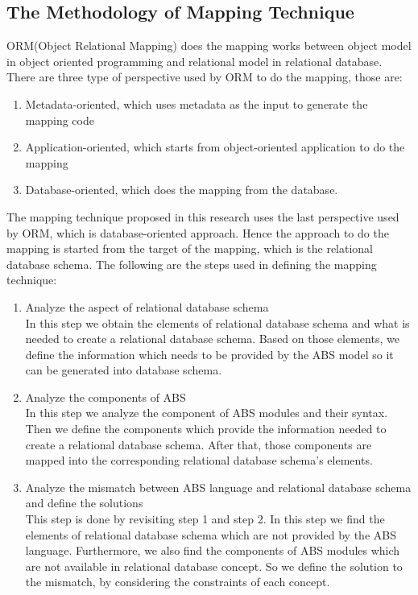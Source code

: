 \documentclass[conference]{IEEEtran}
\begin{document}
\subsection{The Methodology of Mapping Technique}
ORM(Object Relational Mapping) does the mapping works between object model in object oriented programming and relational model in relational database. There are three type of perspective used by ORM to do the mapping, those are:
\begin{enumerate}
	\item Metadata-oriented, which uses metadata as the input to generate the mapping code
	\item Application-oriented, which starts from object-oriented application to do the mapping
	\item Database-oriented, which does the mapping from the database.
\end{enumerate}

The mapping technique proposed in this research uses the last perspective used by ORM, which is database-oriented approach. Hence the approach to do the mapping is started from the target of the mapping, which is the relational database schema. The following are the steps used in defining the mapping technique:

\begin{enumerate}
	\item Analyze the aspect of relational database schema\\
	In this step we obtain the elements of relational database schema and what is needed to create a relational database schema. Based on those elements, we define the information which needs to be provided by the ABS model so it can be generated into database schema.
	\item Analyze the components of ABS\\
	In this step we analyze the component of ABS modules and their syntax. Then we define the components which provide the information needed to create a relational database schema. After that, those components are mapped into the corresponding relational database schema’s elements.
	\item Analyze the mismatch between ABS language and relational database schema and define the solutions\\
	This step is done by revisiting step 1 and step 2. In this step we find the elements of relational database schema which are not provided by the ABS language. Furthermore, we also find the components of ABS modules which are not available in relational database concept. So we define the solution to the mismatch, by considering the constraints of each concept.
\end{enumerate}
\end{document}
